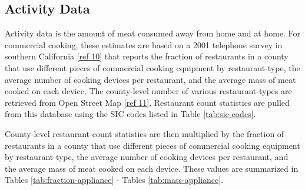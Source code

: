 \documentclass[
  11pt,
  oneside]{book}
\begin{document}
\subsection{Activity Data}\label{activity-data}

Activity data is the amount of meat consumed away from home and at home. For commercial cooking, these estimates are based on a 2001 telephone survey in southern California \hyperref[cooking-references]{{[}ref 10{]}} that reports the fraction of restaurants in a county that use different pieces of commercial cooking equipment by restaurant-type, the average number of cooking devices per restaurant, and the average mass of meat cooked on each device. The county-level number of various restaurant-types are retrieved from Open Street Map \hyperref[cooking-references]{{[}ref 11{]}}. Restaurant count statistics are pulled from this database using the SIC codes listed in Table \ref{tab:sic-codes}.

\begin{table}
\centering
\caption{\label{tab:sic-codes}SIC codes used to classify restaurant types.}
\centering
{}
\end{table}

County-level restaurant count statistics are then multiplied by the fraction of restaurants in a county that use different pieces of commercial cooking equipment by restaurant-type, the average number of cooking devices per restaurant, and the average mass of meat cooked on each device. These values are summarized in Tables \ref{tab:fraction-appliance} - Tables \ref{tab:mass-appliance}.
\end{document}
